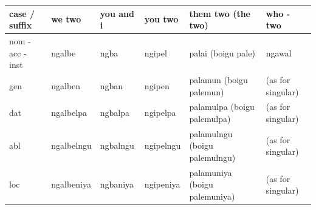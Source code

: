 \documentclass{article}
\begin{document}
\begin{tabular}{llllll}
\toprule
case / suffix & we two & you and i & you two & them two (the two) & who - two \\
\midrule
nom - acc - inst & ngalbe & ngba & ngipel & palai (boigu pale) & ngawal \\
gen & ngalben & ngban & ngipen & palamun (boigu palemun) & (as for singular) \\
dat & ngalbelpa & ngbalpa & ngipelpa & palamulpa (boigu palemulpa) & (as for singular) \\
abl & ngalbelngu & ngbalngu & ngipelngu & palamulngu (boigu palemulngu) & (as for singular) \\
loc & ngalbeniya & ngbaniya & ngipeniya & palamuniya (boigu palemuniya) & (as for singular) \\
\bottomrule
\end{tabular}
\end{document}
